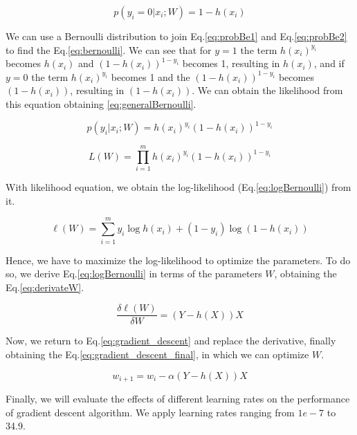 \documentclass{article}
\begin{document}
\begin{equation}
  \label{eq:probBe2}
  p(y_i=0|x_i;W) = 1 - h(x_i)
\end{equation}

We can use a Bernoulli distribution to join Eq.\eqref{eq:probBe1} and Eq.\eqref{eq:probBe2} to find the Eq.\eqref{eq:bernoulli}. We can see that for $y=1$ the term $h(x_i)^{y_i}$ becomes $h(x_i)$ and $(1 - h(x_i))^{1 - y_i}$ becomes 1, resulting in $h(x_i)$, and if $y=0$ the term $h(x_i)^{y_i}$ becomes 1 and the $(1 - h(x_i))^{1 - y_i}$ becomes $(1 - h(x_i))$, resulting in $(1 - h(x_i))$. We can obtain the likelihood from this equation obtaining \eqref{eq:generalBernoulli}.

\begin{equation}
  \label{eq:bernoulli}
  p(y_i|x_i;W) = h(x_i)^{y_i}(1 - h(x_i))^{1 - y_i} 
\end{equation}

\begin{equation}
  \label{eq:generalBernoulli}
  L(W) = \prod_{i=1}^{m} h(x_i)^{y_i}(1 - h(x_i))^{1 - y_i} 
\end{equation}

With likelihood equation, we obtain the log-likelihood (Eq.\eqref{eq:logBernoulli}) from it.

\begin{equation}
  \label{eq:logBernoulli}
  \ell(W) = \sum_{i=1}^{m} y_i\log{h(x_i)} + (1 - y_i)\log{(1 - h(x_i))} 
\end{equation}

Hence, we have to maximize the log-likelihood to optimize the parameters. To do so, we derive Eq.\eqref{eq:logBernoulli} in terms of the parameters $W$, obtaining the Eq.\eqref{eq:derivateW}.

\begin{equation}
  \label{eq:derivateW}
  \frac{\delta\ell(W)}{\delta W} = (Y - h(X))X
\end{equation}

Now, we return to Eq.\eqref{eq:gradient_descent} and replace the derivative, finally obtaining the Eq.\eqref{eq:gradient_descent_final}, in which we can optimize $W$.

\begin{equation}
  \label{eq:gradient_descent_final}
  w_{i+1} = w_{i} - \alpha (Y - h(X))X
\end{equation}

Finally, we will evaluate the effects of different learning rates on the performance of gradient descent algorithm. We apply learning rates ranging from $1e-7$ to 34.9.
\end{document}
